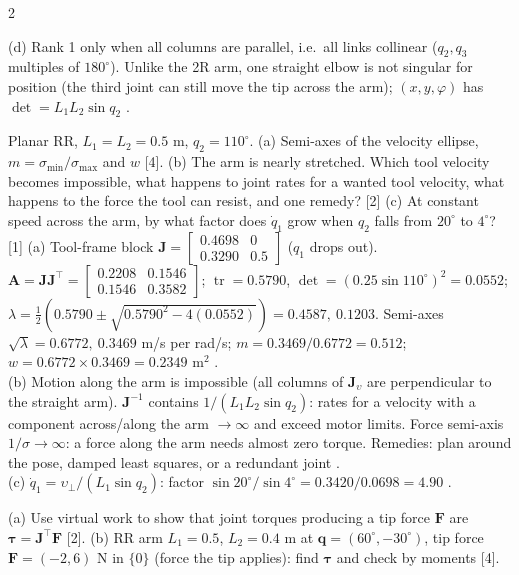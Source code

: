 \begin{multicols}{2}
\begin{examq}
(d) Rank 1 only when all columns are parallel, i.e.\ all links collinear ($q_2,q_3$ multiples of $180^\circ$). Unlike the 2R arm, one straight elbow is not singular for position (the third joint can still move the tip across the arm); $(x,y,\varphi)$ has $\det=L_1L_2\sin q_2$ . \chk
\end{examq}
\begin{examq}
Planar RR, $L_1=L_2=0.5$ m, $q_2=110^\circ$. (a) Semi-axes of the velocity ellipse, $m=\sigma_{\min}/\sigma_{\max}$ and $w$ [4]. (b) The arm is nearly stretched. Which tool velocity becomes impossible, what happens to joint rates for a wanted tool velocity, what happens to the force the tool can resist, and one remedy? [2] (c) At constant speed across the arm, by what factor does $\dot q_1$ grow when $q_2$ falls from $20^\circ$ to $4^\circ$? [1]
\solution
(a) Tool-frame block $\mathbf J=\begin{bmatrix}0.4698&0\\0.3290&0.5\end{bmatrix}$ ($q_1$ drops out). $\mathbf A=\mathbf J\mathbf J^\top=\begin{bmatrix}0.2208&0.1546\\0.1546&0.3582\end{bmatrix}$; $\operatorname{tr}=0.5790$, $\det=(0.25\sin110^\circ)^2=0.0552$; $\lambda=\tfrac12(0.5790\pm\sqrt{0.5790^2-4(0.0552)})=0.4587,\ 0.1203$. Semi-axes $\sqrt\lambda=0.6772,\ 0.3469$ m/s per rad/s; $m=0.3469/0.6772=0.512$; $w=0.6772\times0.3469=0.2349$ m$^2$ .\\
(b) Motion along the arm is impossible (all columns of $\mathbf J_\upsilon$ are perpendicular to the straight arm). $\mathbf J^{-1}$ contains $1/(L_1L_2\sin q_2)$: rates for a velocity with a component across/along the arm $\to\infty$ and exceed motor limits. Force semi-axis $1/\sigma\to\infty$: a force along the arm needs almost zero torque. Remedies: plan around the pose, damped least squares, or a redundant joint .\\
(c) $\dot q_1=\upsilon_\perp/(L_1\sin q_2)$: factor $\sin20^\circ/\sin4^\circ=0.3420/0.0698=4.90$ . \chk
\end{examq}
\begin{examq}[Q6: derive $\boldsymbol\tau=\mathbf J^\top\mathbf F$, then use it \mk{marks assumed 6}]
(a) Use virtual work to show that joint torques producing a tip force $\mathbf F$ are $\boldsymbol\tau=\mathbf J^\top\mathbf F$ [2]. (b) RR arm $L_1=0.5$, $L_2=0.4$ m at $\mathbf q=(60^\circ,-30^\circ)$, tip force $\mathbf F=(-2,6)$ N in $\{0\}$ (force the tip applies): find $\boldsymbol\tau$ and check by moments [4].

\end{examq}
\end{multicols}
